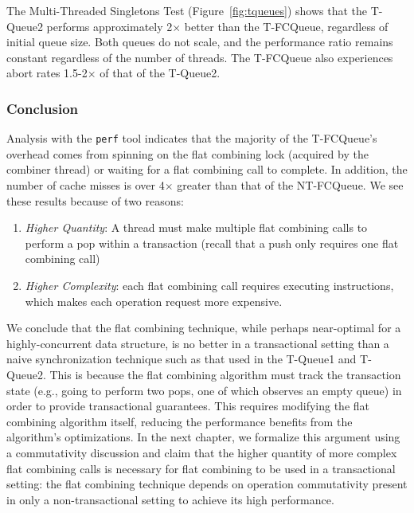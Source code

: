 The Multi-Threaded Singletons Test (Figure~\ref{fig:tqueues}) shows that the T-Queue2 performs approximately 2$\times$ better than the T-FCQueue, regardless of initial queue size. Both queues do not scale, and the performance ratio remains constant regardless of the number of threads. The T-FCQueue also experiences abort rates 1.5-2$\times$ of that of the T-Queue2.

\vspace{12pt}
\noindent{}

\subsubsection{Conclusion}
Analysis with the \texttt{perf} tool indicates that the majority of the T-FCQueue's overhead comes from spinning on the flat combining lock (acquired by the combiner thread) or waiting for a flat combining call to complete. In addition, the number of cache misses is over 4$\times$ greater than that of the NT-FCQueue. We see these results because of two reasons:
\begin{enumerate}
\item \emph{Higher Quantity}: A thread must make multiple flat combining calls to perform a pop within a transaction (recall that a push only requires one flat combining call) 
\item \emph{Higher Complexity}: each flat combining call requires executing instructions, which makes each operation request more expensive.
\end{enumerate}

We conclude that the flat combining technique, while perhaps near-optimal for a highly-concurrent data structure, is no better in a transactional setting than a naive synchronization technique such as that used in the T-Queue1 and T-Queue2. This is because the flat combining algorithm must track the transaction state (e.g., going to perform two pops, one of which observes an empty queue) in order to provide transactional guarantees. This requires modifying the flat combining algorithm itself, reducing the performance benefits from the algorithm's optimizations. In the next chapter, we formalize this argument using a commutativity discussion and claim that the higher quantity of more complex flat combining calls is necessary for flat combining to be used in a transactional setting: the flat combining technique depends on operation commutativity present in only a non-transactional setting to achieve its high performance. 

